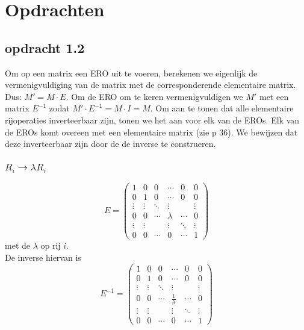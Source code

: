 \documentclass[10pt,a4paper]{article}
\begin{document}
\section{Opdrachten}
\subsection*{opdracht 1.2}
Om op een matrix een ERO uit te voeren, berekenen we eigenlijk de vermenigvuldiging van de matrix met de corresponderende elementaire matrix. Dus: $M' = M \cdot E$. Om de ERO om te keren vermenigvuldigen we $M'$ met een matrix $E^{-1}$ zodat $M'\cdot E^{-1} = M \cdot I = M$.
Om aan te tonen dat alle elementaire rijoperaties inverteerbaar zijn, tonen we het aan voor elk van de EROs. Elk van de EROs komt overeen met een elementaire matrix (zie p 36). We bewijzen dat deze inverteerbaar zijn door de de inverse te construeren.
\subsubsection*{$R_i\rightarrow \lambda R_i$}
\[
E=
\begin{pmatrix}
1 & 0 & 0 & \cdots & 0 & 0\\
0 & 1 & 0 & \cdots & 0 & 0\\
\vdots & \vdots & \ddots & \vdots& & \vdots\\
0 & 0 & \cdots & \lambda & \cdots & 0\\
\vdots & \vdots & & \vdots& \ddots & \vdots\\
0 & 0 & \cdots & 0 & \cdots &1
\end{pmatrix}
\]
met de $\lambda$ op rij $i$.\\
De inverse hiervan is
\[
E^{-1}=
\begin{pmatrix}
1 & 0 & 0 & \cdots & 0 & 0\\
0 & 1 & 0 & \cdots & 0 & 0\\
\vdots & \vdots & \ddots & \vdots& & \vdots\\
0 & 0 & \cdots & \frac{1}{\lambda} & \cdots & 0\\
\vdots & \vdots & & \vdots& \ddots & \vdots\\
0 & 0 & \cdots & 0 & \cdots &1
\end{pmatrix}
\]
\end{document}
